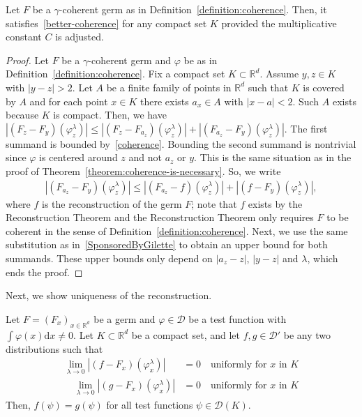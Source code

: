 \begin{proposition}\label{proposition:cutoff}
    Let \(F\) be a \(\gamma\)-coherent germ as in Definition~\ref{definition:coherence}. Then, it satisfies~\eqref{better-coherence} for any compact set \(K\) provided the multiplicative constant \(C\) is adjusted.
\end{proposition}

\begin{proof}
    Let \(F\) be a \(\gamma\)-coherent germ and \(\varphi\) be as in Definition~\ref{definition:coherence}. Fix a compact set \(K \subset \mathbb{R}^d\). Assume \(y,z \in K\) with \(|y-z| > 2\). Let \(A\) be a finite family of points in \(\mathbb{R}^d\) such that \(K\) is covered by \(A\) and for each point \(x \in K\) there exists \(a_x \in A\) with \(|x-a| < 2\). Such \(A\) exists because \(K\) is compact. Then, we have \(|(F_z - F_y)(\varphi^\lambda_z)| \leq |(F_z - F_{a_z})(\varphi^\lambda_z)| + |(F_{a_z} - F_y)(\varphi^\lambda_z)|\). The first summand is bounded by~\eqref{coherence}. Bounding the second summand is nontrivial since \(\varphi\) is centered around \(z\) and not \(a_z\) or \(y\). This is the same situation as in the proof of Theorem~\ref{theorem:coherence-is-necessary}. So, we write
    \begin{align*}
        |(F_{a_z} - F_y)(\varphi^\lambda_z)| \leq |(F_{a_z} - f)(\varphi^\lambda_z)| + |(f - F_y)(\varphi^\lambda_z)|,
    \end{align*}
    where \(f\) is the reconstruction of the germ \(F\); note that \(f\) exists by the Reconstruction Theorem and the Reconstruction Theorem only requires \(F\) to be coherent in the sense of Definition~\ref{definition:coherence}. Next, we use the same substitution as in~\eqref{SponsoredByGilette} to obtain an upper bound for both summands. These upper bounds only depend on \(|a_z - z|\), \(|y - z|\) and \(\lambda\), which ends the proof.  
\end{proof}

Next, we show uniqueness of the reconstruction. 

\begin{theorem}[Uniqueness]\label{theorem:uniqueness-reconstruction}
   Let \(F = {(F_x)}_{x \in \mathbb{R}^d}\) be a germ and \(\varphi \in \mathcal{D}\) be a test function with \(\int \varphi(x) \mathrm{d}x \neq 0\). Let \(K \subset \mathbb{R}^d\) be a compact set, and let \(f, g \in \mathcal{D}'\) be any two distributions such that
   \begin{align*}
       \lim_{\lambda \to 0} |(f-F_x)(\varphi^\lambda_x)| &= 0 \quad \text{uniformly for \(x\) in \(K\)} \\ 
       \quad \lim_{\lambda \to 0} |(g-F_x)(\varphi^\lambda_x)| &= 0 \quad \text{uniformly for \(x\) in \(K\)}
   \end{align*} 
    Then, \(f(\psi) = g(\psi)\) for all test functions \(\psi \in \mathcal{D}(K)\).  
\end{theorem}

